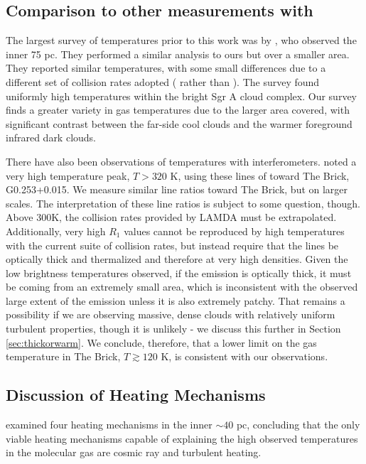 \subsection{Comparison to other measurements with \para}
\label{sec:h2cocompare}
The largest survey of \para temperatures prior to this work was by
\citet{Ao2013a}, who observed the inner 75 pc.  They performed a similar
analysis to ours but over a smaller area.  They reported similar temperatures,
with some small differences due to a different set of collision rates adopted
(\citet{Wiesenfeld2013a} rather than \citet{Green1991a}).
The \citet{Ao2013a} survey found uniformly high temperatures within the bright
Sgr A cloud complex.  Our survey finds a greater variety in gas temperatures due
to the larger area covered, with significant contrast between the far-side
cool clouds and the warmer foreground infrared dark clouds.

There have also been observations of \para temperatures with interferometers.
\citet{Johnston2014a} noted a very high temperature peak, $T>320$ K, using these
lines of \para toward The Brick, G0.253+0.015.  We measure similar line
ratios toward The Brick, but on larger scales.  The interpretation of these
line ratios is subject to some question, though.  Above 300K, the collision
rates provided by LAMDA \citep{Green1991a,Schoier2005a,Wiesenfeld2013a} must be
extrapolated.  Additionally, very high $R_1$ values cannot be
reproduced by high temperatures with the current suite of collision rates, but
instead require that the lines be optically thick and thermalized and therefore
at very high densities.   Given the low brightness temperatures observed, if
the emission is optically thick, it must be coming from an extremely small
area, which is inconsistent with the observed large extent of the emission
unless it is also extremely patchy.  That remains a possibility if we are
observing massive, dense clouds with relatively uniform turbulent properties,
though it is unlikely - we discuss this further in Section
\ref{sec:thickorwarm}.  We conclude, therefore, that a lower limit on the
gas temperature in The Brick, $T\gtrsim120$ K, is consistent with our observations.


\subsection{Discussion of Heating Mechanisms}
\citet{Ao2013a} examined four heating mechanisms in the inner $\sim 40$ pc,
concluding that the only viable heating mechanisms capable of explaining the
high observed temperatures in the molecular gas are cosmic ray and turbulent
heating.  

